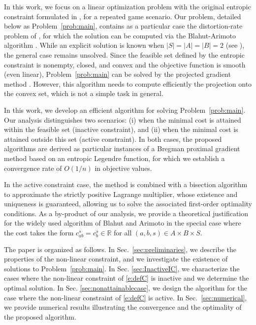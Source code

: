 \documentclass[smallextended,referee,envcountsect,]{svjour3}
\begin{document}
{In this work, we focus on a linear optimization problem with the  
original entropic constraint} formulated in 
\cite{GossnerHernandezNeyman06}, {for a repeated game 
scenario}. {Our problem, detailed below as 
Problem~\ref{prob:main}, contains as a particular 
case the distortion-rate problem of \cite[equation 
(10.160)]{cover-book-2006}, for which the solution can be computed 
via the Blahut-Arimoto 
algorithm \cite{Arimoto72,Blahut72,Csiszar74}.} While an explicit 
solution is 
known {when} %
 $|S| = |A| = |B| = 2$ (see 
\cite[Example~2.1]{GossnerHernandezNeyman06}), the general 
case remains unsolved. 
Since the feasible set defined by the entropic constraint is 
nonempty, closed, and convex and the 
objective function is smooth (even 
linear), Problem~\ref{prob:main} can be solved by the projected 
gradient method \cite{levitin1966constrained}. However, 
this algorithm needs to compute efficiently the projection onto 
the convex set, which is not a simple task in general. 

In this work, we develop an efficient algorithm for solving 
Problem~\ref{prob:main}. Our analysis distinguishes two 
scenarios: (i) when the minimal cost is attained within the feasible 
set (inactive constraint), and (ii) when the minimal cost is attained 
outside 
this set (active constraint). In both cases, the proposed algorithms 
are derived as particular instances of a Bregman proximal gradient 
method based on an entropic Legendre function, for which we 
establish {a 
convergence} rate of $O(1/n)$ in objective values. 

In the active constraint case, the method is combined with a 
bisection algorithm to approximate the strictly positive Lagrange 
multiplier{, whose existence and uniqueness is guaranteed,} 
allowing us to solve the associated first-order optimality 
conditions. As a by-product of our analysis, we provide a 
theoretical justification for the widely used algorithm of Blahut and 
Arimoto \cite{Arimoto72,Blahut72} in the special case where the 
cost takes the form $c_{ab}^s = c_b^s \in \mathbb{R}$ for all $(a, 
b, s) \in A \times B \times S$.

{The paper is organized as follows.} In 
Sec.~\ref{sec:preliminaries}, we describe the properties of the 
non-linear constraint, and we investigate the existence of solutions 
to Problem~\ref{prob:main}. In Sec. \ref{sec:InactiveIC}, we 
characterize the cases where the non-linear constraint of 
\eqref{e:defC} is inactive and we determine the optimal solution. In 
Sec. 
\ref{sec:nonattainablecase}, we design the algorithm for the case 
where the non-linear constraint of \eqref{e:defC} is active. In 
Sec.~\ref{sec:numerical}, we 
provide numerical results illustrating the convergence and the 
optimality of the proposed algorithm.
\end{document}
